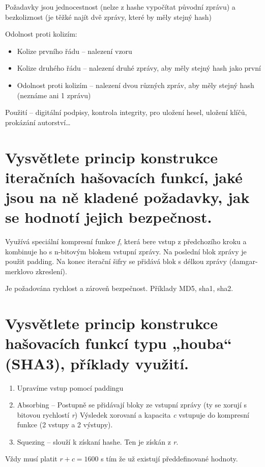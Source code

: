 Požadavky jsou jednocestnost (nelze z hashe vypočítat původní zprávu) a bezkoliznost (je těžké najít dvě zprávy, které by měly stejný hash)

Odolnost proti kolizím:
\begin{itemize}
    \item Kolize prvního řádu -- nalezení vzoru
    \item Kolize druhého řádu -- nalezení druhé zprávy, aby měly stejný hash jako první
    \item Odolnost proti kolizím -- nalezení dvou různých zpráv, aby měly stejný hash (neznáme ani 1 zprávu)
\end{itemize}

Použití -- digitální podpisy, kontrola integrity, pro uložení hesel, uložení klíčů, prokázání autorství\dots

\section{Vysvětlete princip konstrukce iteračních hašovacích funkcí, jaké jsou na ně kladené požadavky, jak se hodnotí jejich bezpečnost.}

Využívá speciální kompresní funkce \textit{f}, která bere vstup z předchozího kroku a kombinuje ho s n-bitovým blokem vstupní zprávy. Na poslední blok zprávy je použit padding. Na konec iterační šifry se přidává blok s délkou zprávy (damgar-merklovo zkreslení).

Je požadována rychlost a zároveň bezpečnost. Příklady MD5, sha1, sha2.

\section{Vysvětlete princip konstrukce hašovacích funkcí typu „houba“ (SHA3), příklady využití.}

\begin{enumerate}
    \item Upravíme vstup pomocí paddingu
    \item Absorbing -- Postupně se přidávají bloky ze vstupní zprávy (ty se xorují s bitovou rychlostí \textit{r}) Výsledek xorovaní a kapacita \textit{c} vstupuje do kompresní funkce (2 vstupy a 2 výstupy).
    \item Squezing -- slouží k získaní hashe. Ten je získán z \textit{r}.
\end{enumerate}

Vždy musí platit $r+c=1600$ s tím že už existují předdefinované hodnoty.

